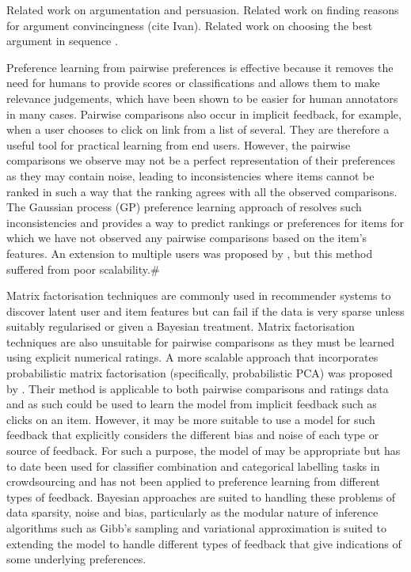 Related work on argumentation and persuasion. Related work on finding reasons for argument convincingness (cite Ivan). Related work on choosing the best argument in sequence \cite{rosenfeld2016providing, monteserin2013reinforcement}. 

Preference learning from pairwise preferences is effective because it removes the need for humans to provide scores or classifications and allows them to make relevance judgements,
which have been shown to be easier for human annotators in many cases\cite{brochu_active_2007}. Pairwise comparisons also occur in implicit feedback, for example, when a user chooses to click on link from a list of several. They are therefore a useful tool for practical learning from end users. 
However, the pairwise comparisons we observe may not be a perfect representation of their preferences as they may contain noise, leading to inconsistencies where items cannot be ranked in such a way that the ranking agrees with all the observed comparisons. 
The Gaussian process (GP) preference learning approach of \cite{chu_preference_2005} resolves such inconsistencies and provides a way to predict rankings or preferences for 
items for which we have not observed any pairwise comparisons based on the item's features. 
An extension to multiple users was proposed by \cite{houlsby2012collaborative}, 
but this method suffered from poor scalability.#

Matrix factorisation techniques are commonly used in recommender systems to discover latent
user and item features but can fail if the
data is very sparse unless suitably regularised or given a Bayesian treatment.
Matrix factorisation techniques are also unsuitable for pairwise comparisons as they 
must be learned using explicit numerical ratings.
A more scalable approach that incorporates probabilistic matrix factorisation
(specifically, probabilistic PCA) was proposed by \cite{khan2014scalable}.
Their method is applicable to both pairwise comparisons and ratings data
and as such could be used to learn the model from implicit feedback such as clicks on an item. However, it may be more suitable to use a model for such feedback that explicitly considers the different bias and noise of each type or source of feedback. For such
a purpose, the model of \cite{dawid_maximum_1979} may be appropriate but has to date
been used for classifier combination and categorical labelling tasks in crowdsourcing and has not been applied to preference learning from different types of feedback. 
Bayesian approaches are suited to handling these problems of data sparsity, noise and bias, 
particularly as the modular nature of inference algorithms such as Gibb's sampling and variational approximation is suited to extending the model to handle different types of feedback that give indications of some underlying preferences. 


